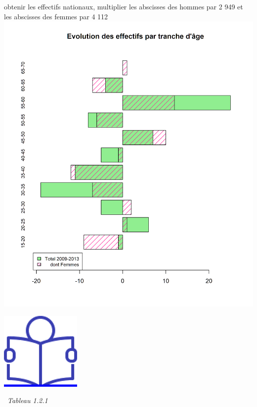 obtenir les effectifs nationaux, multiplier les abscisses des hommes par
2 949 et les abscisses des femmes par 4 112\newpage
\includegraphics{altair_files/figure-latex/unnamed-chunk-11-3.png}

\href{../Docs/Notices/fiche_3.odt}{\includegraphics{icones/Notice.png}}

\newpage

~\emph{Tableau 1.2.1}

